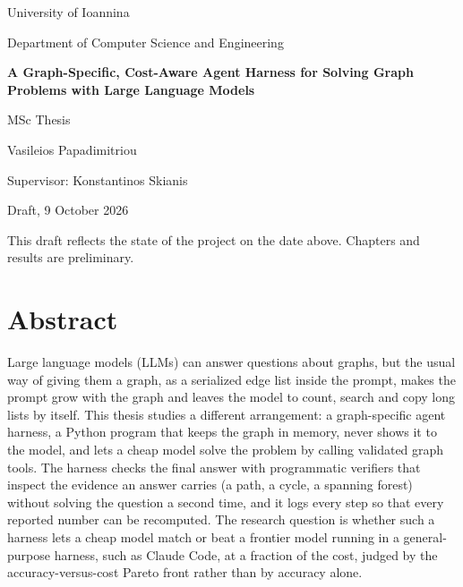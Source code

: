 \documentclass[12pt,a4paper]{report}
\begin{document}
\begin{titlepage}
  \centering
  {\large University of Ioannina\par}
  {\large Department of Computer Science and Engineering\par}
  \vspace{3cm}
  {\LARGE\bfseries A Graph-Specific, Cost-Aware Agent Harness for Solving Graph Problems with Large Language Models\par}
  \vspace{1.5cm}
  {\large MSc Thesis\par}
  \vspace{2cm}
  {\large Vasileios Papadimitriou\par}
  \vspace{1cm}
  {\large Supervisor: Konstantinos Skianis\par}
  \vfill
  {\large Draft, 9 October 2026\par}
  \vspace{0.5cm}
  {\small This draft reflects the state of the project on the date above. Chapters and results are preliminary.\par}
\end{titlepage}


\chapter*{Abstract}
Large language models (LLMs) can answer questions about graphs, but the usual way of giving them a graph, as a
serialized edge list inside the prompt, makes the prompt grow with the graph and leaves the model to count, search and
copy long lists by itself. This thesis studies a different arrangement: a graph-specific agent harness, a Python program
that keeps the graph in memory, never shows it to the model, and lets a cheap model solve the problem by calling
validated graph tools. The harness checks the final answer with programmatic verifiers that inspect the evidence an
answer carries (a path, a cycle, a spanning forest) without solving the question a second time, and it logs every step
so that every reported number can be recomputed. The research question is whether such a harness lets a cheap model
match or beat a frontier model running in a general-purpose harness, such as Claude Code, at a fraction of the cost,
judged by the accuracy-versus-cost Pareto front rather than by accuracy alone.
\end{document}
